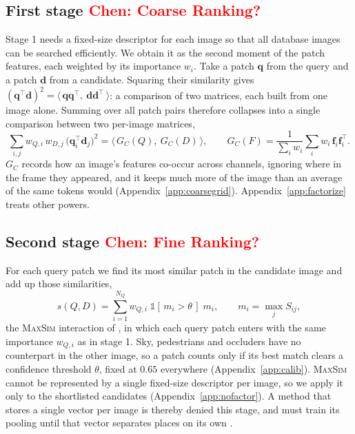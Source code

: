 \subsection{First stage \textcolor{red}{Chen: Coarse Ranking?}}
\label{sec:global}
Stage 1 needs a fixed-size descriptor for each image so that all database images can be searched efficiently. We obtain it as the second moment of the patch features, each weighted by its importance $w_i$. Take a patch $\mathbf q$ from the query and a patch $\mathbf d$ from a candidate. Squaring their similarity gives $(\mathbf q^{\top}\mathbf d)^2=\langle\,\mathbf q\mathbf q^{\top},\ \mathbf d\mathbf d^{\top}\,\rangle$: a comparison of two matrices, each built from one image alone. Summing over all patch pairs therefore collapses into a single comparison between two per-image matrices,
\begin{equation}\label{eq:so-deriv}
  \sum_{i,j} w_{Q,i}\,w_{D,j}\,\big(\mathbf q_i^{\top}\mathbf d_j\big)^{2}
  =\big\langle\, G_C(Q),\ G_C(D)\,\big\rangle,
  \qquad
  G_C(F)=\frac{1}{\sum_i w_i}\sum_i w_i\,\mathbf f_i\mathbf f_i^{\top}.
\end{equation}
$G_C$ records how an image's features co-occur across channels, ignoring where in the frame they appeared, and it keeps much more of the image than an average of the same tokens would (Appendix~\ref{app:coarsegrid}). Appendix~\ref{app:factorize} treats other powers.

\subsection{Second stage \textcolor{red}{Chen: Fine Ranking?}}
\label{sec:core}
For each query patch we find its most similar patch in the candidate image and add up those similarities,
\begin{equation}\label{eq:stage2}
  s(Q,D)=\sum_{i=1}^{N_Q} w_{Q,i}\;\mathbb 1[\,m_i>\theta\,]\;m_i,
  \qquad
  m_i=\max_{j} S_{ij},
\end{equation}
the \textsc{MaxSim} interaction of \citet{colbert}, in which each query patch enters with the same importance $w_{Q,i}$ as in stage 1. Sky, pedestrians and occluders have no counterpart in the other image, so a patch counts only if its best match clears a confidence threshold $\theta$, fixed at $0.65$ everywhere (Appendix~\ref{app:calib}). \textsc{MaxSim} cannot be represented by a single fixed-size descriptor per image, so we apply it only to the shortlisted candidates (Appendix~\ref{app:nofactor}). A method that stores a single vector per image is thereby denied this stage, and must train its pooling until that vector separates places on its own \citep{netvlad}.
